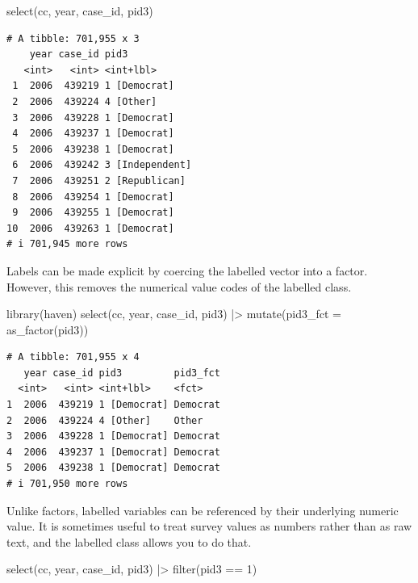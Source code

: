 \documentclass[10pt,article,oneside]{memoir}
\newenvironment{Shaded}{\begin{snugshade}}{\end{snugshade}}
\newcommand{\AttributeTok}[1]{\textcolor[rgb]{0.40,0.45,0.13}{#1}}
\newcommand{\DecValTok}[1]{\textcolor[rgb]{0.68,0.00,0.00}{#1}}
\newcommand{\FunctionTok}[1]{\textcolor[rgb]{0.28,0.35,0.67}{#1}}
\newcommand{\NormalTok}[1]{\textcolor[rgb]{0.00,0.23,0.31}{#1}}
\newcommand{\SpecialCharTok}[1]{\textcolor[rgb]{0.37,0.37,0.37}{#1}}
\begin{document}
\begin{Shaded}
\begin{Highlighting}[]
\FunctionTok{select}\NormalTok{(cc, year, case\_id, pid3)}
\end{Highlighting}
\end{Shaded}

\begin{verbatim}
# A tibble: 701,955 x 3
    year case_id pid3           
   <int>   <int> <int+lbl>      
 1  2006  439219 1 [Democrat]   
 2  2006  439224 4 [Other]      
 3  2006  439228 1 [Democrat]   
 4  2006  439237 1 [Democrat]   
 5  2006  439238 1 [Democrat]   
 6  2006  439242 3 [Independent]
 7  2006  439251 2 [Republican] 
 8  2006  439254 1 [Democrat]   
 9  2006  439255 1 [Democrat]   
10  2006  439263 1 [Democrat]   
# i 701,945 more rows
\end{verbatim}

\noindent Labels can be made explicit by coercing the labelled vector
into a factor. However, this removes the numerical value codes of the
labelled class.

\begin{Shaded}
\begin{Highlighting}[]
\FunctionTok{library}\NormalTok{(haven)}
\FunctionTok{select}\NormalTok{(cc, year, case\_id, pid3) }\SpecialCharTok{|\textgreater{}} 
  \FunctionTok{mutate}\NormalTok{(}\AttributeTok{pid3\_fct =} \FunctionTok{as\_factor}\NormalTok{(pid3))}
\end{Highlighting}
\end{Shaded}

\begin{verbatim}
# A tibble: 701,955 x 4
   year case_id pid3         pid3_fct
  <int>   <int> <int+lbl>    <fct>   
1  2006  439219 1 [Democrat] Democrat
2  2006  439224 4 [Other]    Other   
3  2006  439228 1 [Democrat] Democrat
4  2006  439237 1 [Democrat] Democrat
5  2006  439238 1 [Democrat] Democrat
# i 701,950 more rows
\end{verbatim}

\noindent Unlike factors, labelled variables can be referenced by their
underlying numeric value. It is sometimes useful to treat survey values
as numbers rather than as raw text, and the labelled class allows you to
do that.

\begin{Shaded}
\begin{Highlighting}[]
\FunctionTok{select}\NormalTok{(cc, year, case\_id, pid3) }\SpecialCharTok{|\textgreater{}} 
  \FunctionTok{filter}\NormalTok{(pid3 }\SpecialCharTok{==} \DecValTok{1}\NormalTok{)}
\end{Highlighting}
\end{Shaded}
\end{document}
